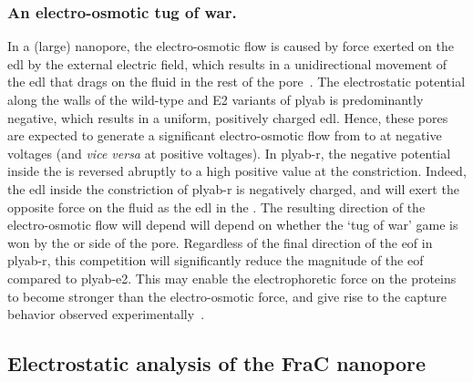 \subsubsection{An electro-osmotic tug of war.}
%
In a (large) nanopore, the electro-osmotic flow is caused by force exerted on the \gls{edl} by the external
electric field, which results in a unidirectional movement of the \gls{edl} that drags on the fluid in the
rest of the pore~\cite{Qiao-Aluru-2003,Mao-2014,Tagliazucchi-2015,Bonome-2017}. The electrostatic potential
along the walls of the wild-type and E2 variants of \gls{plyab} is predominantly negative, which results in a
uniform, positively charged \gls{edl}. Hence, these pores are expected to generate a significant
electro-osmotic flow from \cisi{} to \transi{} at negative voltages (and \textit{vice versa} at positive
voltages). In \gls{plyab-r}, the negative potential inside the \transi{} \lumen{} is reversed abruptly to a
high positive value at the \cisi{} constriction. Indeed, the \gls{edl} inside the constriction of
\gls{plyab-r} is negatively charged, and will exert the opposite force on the fluid as the \gls{edl} in the
\transi{} \lumen{}. The resulting direction of the electro-osmotic flow will depend will depend on whether the
`tug of war' game is won by the \cisi{} or \transi{} side of the pore. Regardless of the final direction of
the \gls{eof} in \gls{plyab-r}, this competition will significantly reduce the magnitude of the \gls{eof}
compared to \gls{plyab-e2}. This may enable the electrophoretic force on the proteins to become stronger than
the electro-osmotic force, and give rise to the capture behavior observed experimentally~\cite{Huang-2020}.


\subsection{Electrostatic analysis of the FraC nanopore}
%
\label{sec:elec:frac}
%

